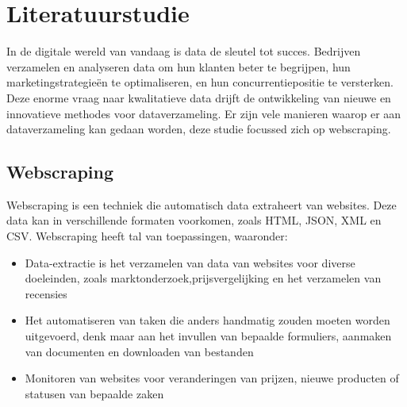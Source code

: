 
\section{Literatuurstudie}
\label{sec:Literatuurstudie}
In de digitale wereld van vandaag is data de sleutel tot succes. Bedrijven verzamelen en analyseren data om hun klanten beter te begrijpen, 
hun marketingstrategieën te optimaliseren, en hun concurrentiepositie te versterken. Deze enorme vraag naar kwalitatieve data drijft de ontwikkeling 
van nieuwe en innovatieve methodes voor dataverzameling. Er zijn vele manieren waarop er aan dataverzameling kan gedaan worden, deze studie focussed
zich op webscraping.

\subsection{Webscraping}
\label{sec:Webscraping}
Webscraping is een techniek die automatisch data extraheert van websites. Deze data kan in verschillende formaten
voorkomen, zoals HTML, JSON, XML en CSV. Webscraping heeft tal van toepassingen, waaronder:
\begin{itemize}
  \item Data-extractie is het verzamelen van data van websites voor diverse doeleinden, 
      zoals marktonderzoek,prijsvergelijking en het verzamelen van recensies
  \item Het automatiseren van taken die anders handmatig zouden moeten worden uitgevoerd, denk maar 
  aan het invullen van bepaalde formuliers, aanmaken van documenten en downloaden van bestanden
  \item Monitoren van websites voor veranderingen van prijzen, nieuwe producten of statusen van bepaalde zaken
\end{itemize}

